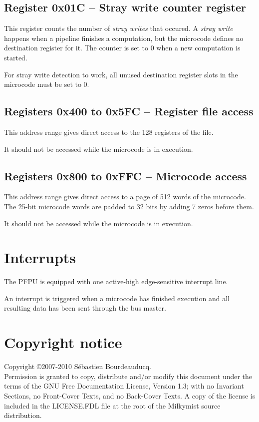 \documentclass[a4paper,11pt]{article}
\begin{document}
\subsection{Register 0x01C -- Stray write counter register}
This register counts the number of \textit{stray writes} that occured. A \textit{stray write} happens when a pipeline finishes a computation, but the microcode defines no destination register for it. The counter is set to 0 when a new computation is started.

For stray write detection to work, all unused destination register slots in the microcode must be set to 0.

\subsection{Registers 0x400 to 0x5FC -- Register file access}
This address range gives direct access to the 128 registers of the file.

It should not be accessed while the microcode is in execution.

\subsection{Registers 0x800 to 0xFFC -- Microcode access}
This address range gives direct access to a page of 512 words of the microcode. The 25-bit microcode words are padded to 32 bits by adding 7 zeros before them.

It should not be accessed while the microcode is in execution.

\section{Interrupts}
The PFPU is equipped with one active-high edge-sensitive interrupt line.

An interrupt is triggered when a microcode has finished execution and all resulting data has been sent through the bus master.

\section*{Copyright notice}
Copyright \copyright 2007-2010 S\'ebastien Bourdeauducq. \\
Permission is granted to copy, distribute and/or modify this document under the terms of the GNU Free Documentation License, Version 1.3; with no Invariant Sections, no Front-Cover Texts, and no Back-Cover Texts. A copy of the license is included in the LICENSE.FDL file at the root of the Milkymist source distribution.
\end{document}

